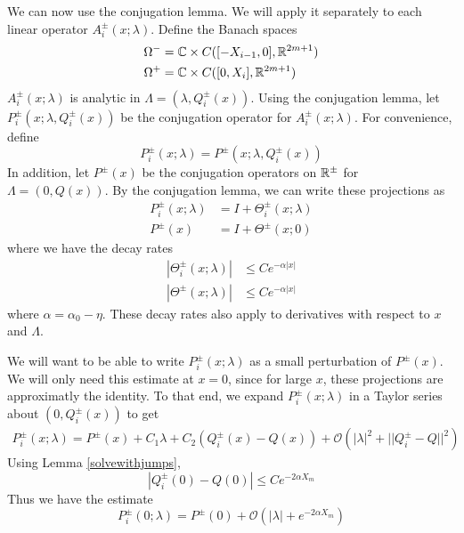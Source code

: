 \documentclass[thesis.tex]{subfiles}
\begin{document}
We can now use the conjugation lemma. We will apply it separately to each linear operator $A_i^\pm(x; \lambda)$. Define the Banach spaces
\begin{align*}
\Omega^- &= {\mathbb C} \times C([-X_{i-1}, 0], {\mathbb R}^{2m+1}) \\
\Omega^+ &= {\mathbb C} \times C([0, X_i], {\mathbb R}^{2m+1})
\end{align*}
$A_i^\pm(x; \lambda)$ is analytic in $\Lambda = (\lambda, Q_i^\pm(x))$. Using the conjugation lemma, let $P_i^\pm(x; \lambda, Q_i^\pm(x) )$ be the conjugation operator for $A_i^\pm(x; \lambda)$. For convenience, define 
\begin{equation}\label{defPipm}
P_i^\pm(x; \lambda) = P^\pm(x; \lambda, Q_i^\pm(x) )
\end{equation}
In addition, let $P^\pm(x)$ be the conjugation operators on ${\mathbb R}^\pm$ for $\Lambda = (0, Q(x))$. By the conjugation lemma, we can write these projections as
\begin{equation}\label{projTheta}
\begin{aligned}
P_i^\pm(x; \lambda) &= I + \Theta_i^\pm(x; \lambda)  \\
P^\pm(x) &= I + \Theta^\pm(x; 0)
\end{aligned}
\end{equation}
where we have the decay rates
\begin{equation}\label{Thetadecay}
\begin{aligned}
|\Theta_i^\pm(x; \lambda)| &\leq C e^{-\alpha |x|} \\
|\Theta^\pm(x; \lambda)| &\leq C e^{-\alpha |x|}
\end{aligned}
\end{equation}
where $\alpha = \alpha_0 - \eta$. These decay rates also apply to derivatives with respect to $x$ and $\Lambda$.

We will want to be able to write $P_i^\pm(x; \lambda)$ as a small perturbation of $P^\pm(x)$. We will only need this estimate at $x = 0$, since for large $x$, these projections are approximatly the identity. To that end, we expand $P_i^\pm(x; \lambda)$ in a Taylor series about $(0, Q_i^\pm(x))$ to get
\begin{align*}
P_i^\pm(x; \lambda) = P^\pm(x) + C_1 \lambda 
+ C_2( Q_i^\pm(x) - Q(x) ) + \mathcal{O}(|\lambda|^2 + ||Q_i^\pm - Q||^2 )
\end{align*}
Using Lemma \ref{solvewithjumps}, 
\begin{equation*}
|Q_i^\pm(0) - Q(0)| \leq C e^{-2 \alpha X_m}
\end{equation*}
Thus we have the estimate
\begin{equation}\label{PTaylor}
P_i^\pm(0; \lambda) = P^\pm(0) + \mathcal{O}(|\lambda| + e^{-2 \alpha X_m})
\end{equation}
\end{document}
